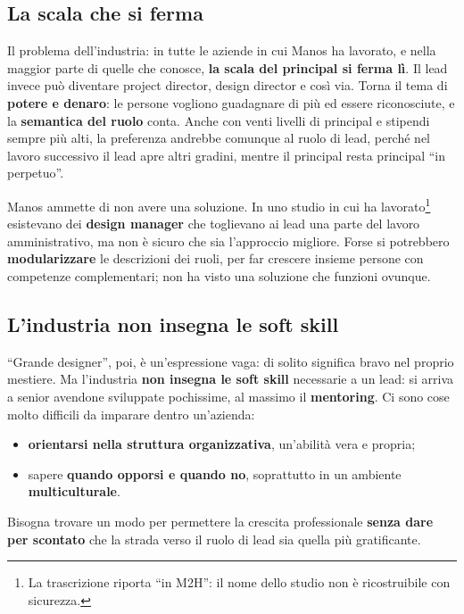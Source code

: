 \subsection{La scala che si ferma}

Il problema dell'industria: in tutte le aziende in cui Manos ha lavorato, e nella
maggior parte di quelle che conosce, \textbf{la scala del principal si ferma lì}.
Il lead invece può diventare project director, design director e così via. Torna
il tema di \textbf{potere e denaro}: le persone vogliono guadagnare di più ed
essere riconosciute, e la \textbf{semantica del ruolo} conta. Anche con venti livelli
di principal e stipendi sempre più alti, la preferenza andrebbe comunque al ruolo
di lead, perché nel lavoro successivo il lead apre altri gradini, mentre il
principal resta principal ``in perpetuo''.

Manos ammette di non avere una soluzione. In uno studio in cui ha
lavorato\footnote{La trascrizione riporta ``in M2H'': il nome dello studio non è
ricostruibile con sicurezza.} esistevano dei \textbf{design manager} che toglievano
ai lead una parte del lavoro amministrativo, ma non è sicuro che sia l'approccio
migliore. Forse si potrebbero \textbf{modularizzare} le descrizioni dei ruoli, per
far crescere insieme persone con competenze complementari; non ha visto una
soluzione che funzioni ovunque.

\subsection{L'industria non insegna le soft skill}

``Grande designer'', poi, è un'espressione vaga: di solito significa bravo nel
proprio mestiere. Ma l'industria \textbf{non insegna le soft skill} necessarie a un
lead: si arriva a senior avendone sviluppate pochissime, al massimo il
\textbf{mentoring}. Ci sono cose molto difficili da imparare dentro un'azienda:
\begin{itemize}
  \item \textbf{orientarsi nella struttura organizzativa}, un'abilità vera e propria;
  \item sapere \textbf{quando opporsi e quando no}, soprattutto in un ambiente
        \textbf{multiculturale}.
\end{itemize}
Bisogna trovare un modo per permettere la crescita professionale \textbf{senza
dare per scontato} che la strada verso il ruolo di lead sia quella più
gratificante.

